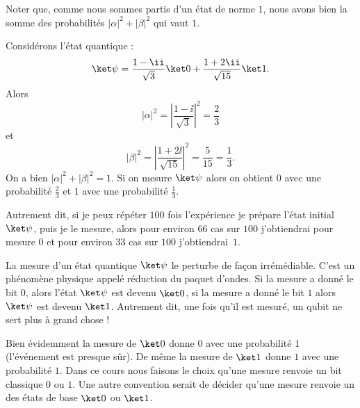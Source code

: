 \documentclass[11pt,class=report,crop=false]{standalone}
\begin{document}
Noter que, comme nous sommes partis d'un état de norme $1$, nous avons bien 
la somme des probabilités $|\alpha|^2+|\beta|^2$ qui vaut $1$.


\begin{exemple}
Considérons l'état quantique :
$$\ket \psi = \frac{1-\ii}{\sqrt3} \ket 0 + \frac{1+2\ii}{\sqrt{15}}\ket 1.$$
Alors 
$$|\alpha|^2 = \left|\frac{1-\ii}{\sqrt3} \right|^2 = \frac{2}{3}$$
et 
$$|\beta|^2 = \left|\frac{1+2\ii}{\sqrt{15}} \right|^2 = \frac{5}{15} = \frac13.$$
On a bien $|\alpha|^2 + |\beta|^2 = 1$.
Si on mesure $\ket \psi$ alors on obtient $0$ avec une probabilité $\frac23$ et $1$ avec une probabilité $\frac13$.

Autrement dit, si je peux répéter $100$ fois l'expérience \og{}je prépare l'état initial $\ket \psi$, puis je le mesure\fg{}, alors pour environ $66$ cas sur $100$ j'obtiendrai pour mesure $0$ et pour environ  $33$ cas sur $100$ j'obtiendrai~$1$.
\end{exemple}

La mesure d'un état quantique $\ket \psi$ le perturbe de façon irrémédiable. C'est un phénomène physique appelé \og{}réduction du paquet d'ondes\fg{}. Si la mesure a donné le bit $0$, alors l'état $\ket \psi$ est devenu $\ket 0$, si la mesure a donné le bit $1$ alors $\ket \psi$ est devenu $\ket 1$. Autrement dit, une fois qu'il est mesuré, un qubit ne sert plus à grand chose !




\begin{remarque*}
Bien évidemment la mesure de $\ket 0$ donne $0$ avec une probabilité $1$ (l'événement est presque sûr). De même la mesure de $\ket 1$ donne $1$ avec une probabilité $1$.
Dans ce cours nous faisons le choix qu'une mesure renvoie un bit classique $0$ ou $1$. Une autre convention serait de décider qu'une mesure renvoie un des états de base $\ket0$ ou $\ket1$.
\end{remarque*}


\bigskip

\end{document}
